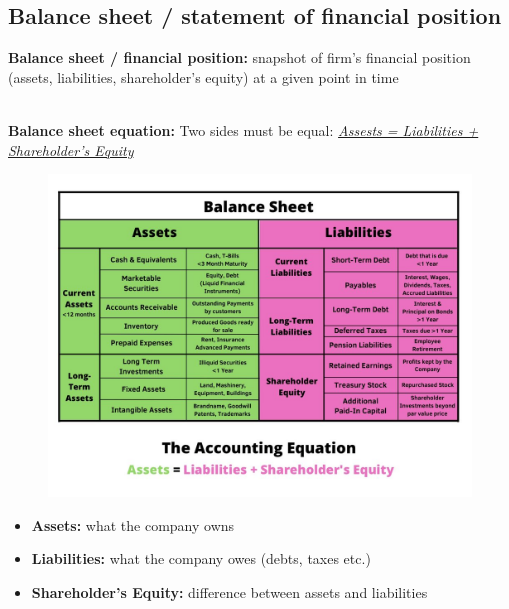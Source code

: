 \documentclass[ieeetran]{article}
\begin{document}
\subsection{Balance sheet / statement of financial position} %
\label{sub:balance_sheet_statement_of_financial_position}

\textbf{Balance sheet / financial position:} snapshot of firm's financial position (assets, liabilities, shareholder's equity) at a given point in time

\textbf{\\Balance sheet equation:} Two sides must be equal: 
\underline{\textit{Assests = Liabilities + Shareholder's Equity}}

\begin{figure}[t]
  \centering
  \includegraphics[width=0.58\linewidth]{balancesheet.jpg}
  \label{fig:balance_sheet_figure}
\end{figure}

\pagebreak

\begin{itemize}
  \item \textbf{Assets:} what the company owns
  \item \textbf{Liabilities:} what the company owes (debts, taxes etc.)
  \item \textbf{Shareholder's Equity:} difference between assets and liabilities
\end{itemize}
\end{document}
